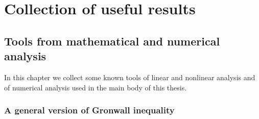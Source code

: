\documentclass[a4paper,10pt,twoside]{amsbook}
\numberwithin{section}{chapter}
\numberwithin{equation}{chapter}
\theoremstyle{definition}
\begin{document}
%

\appendix
\part*{Collection of useful results}

\chapter{Tools from mathematical and numerical analysis}
\label{chap:tools-math}

In this chapter we collect some known tools of linear and nonlinear analysis and of numerical analysis used in the main body of this thesis.

\section{A general version of Gronwall inequality}
\end{document}
